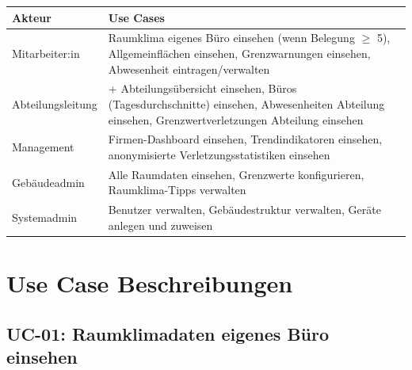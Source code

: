 \documentclass[12pt,a4paper]{article}
\begin{document}
\begin{center}
\begin{tabularx}{\textwidth}{lX}
  \toprule
  \textbf{Akteur} & \textbf{Use Cases} \\
  \midrule
  Mitarbeiter:in & Raumklima eigenes Büro einsehen (wenn Belegung $\geq$ 5), Allgemeinflächen einsehen, Grenzwarnungen einsehen, Abwesenheit eintragen/verwalten \\
  Abteilungsleitung & + Abteilungsübersicht einsehen, Büros (Tagesdurchschnitte) einsehen, Abwesenheiten Abteilung einsehen, Grenzwertverletzungen Abteilung einsehen \\
  Management & Firmen-Dashboard einsehen, Trendindikatoren einsehen, anonymisierte Verletzungsstatistiken einsehen \\
  Gebäudeadmin & Alle Raumdaten einsehen, Grenzwerte konfigurieren, Raumklima-Tipps verwalten \\
  Systemadmin & Benutzer verwalten, Gebäudestruktur verwalten, Geräte anlegen und zuweisen \\
  \bottomrule
\end{tabularx}
\end{center}

\section{Use Case Beschreibungen}

\subsection{UC-01: Raumklimadaten eigenes Büro einsehen}
\end{document}
